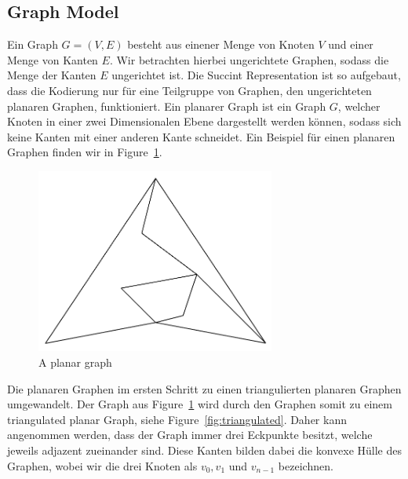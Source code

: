 \documentclass[a4paper]{scrartcl}
\begin{document}
\subsection{Graph Model}
Ein Graph $G=(V,E)$ besteht aus einener Menge von Knoten $V$ und einer Menge von Kanten $E$. Wir betrachten hierbei ungerichtete Graphen, sodass die Menge der Kanten $E$ ungerichtet ist.
Die Succint Representation  ist so aufgebaut, dass die Kodierung nur für eine Teilgruppe von Graphen, den ungerichteten planaren Graphen, funktioniert. Ein planarer Graph ist ein Graph $G$, welcher Knoten in einer zwei Dimensionalen Ebene dargestellt werden können, sodass sich keine Kanten mit einer anderen Kante schneidet. Ein Beispiel für einen planaren Graphen finden wir in Figure~\ref{fig:planar}.


\begin{figure}[h]
	\centering
	\includegraphics[width=0.7\textwidth]{img/planar}
	\caption{A planar graph}
	\label{fig:planar}
\end{figure}


Die planaren Graphen im ersten Schritt zu einen triangulierten planaren Graphen umgewandelt.
Der Graph aus Figure~\ref{fig:planar} wird durch den Graphen somit zu einem triangulated planar Graph, siehe Figure~\ref{fig:triangulated}.
Daher kann angenommen werden, dass der Graph immer drei Eckpunkte besitzt, welche jeweils adjazent zueinander sind. Diese Kanten bilden dabei die konvexe Hülle des Graphen, wobei wir die drei Knoten als $v_0,v_1$ und $v_{n-1}$ bezeichnen.
\end{document}
